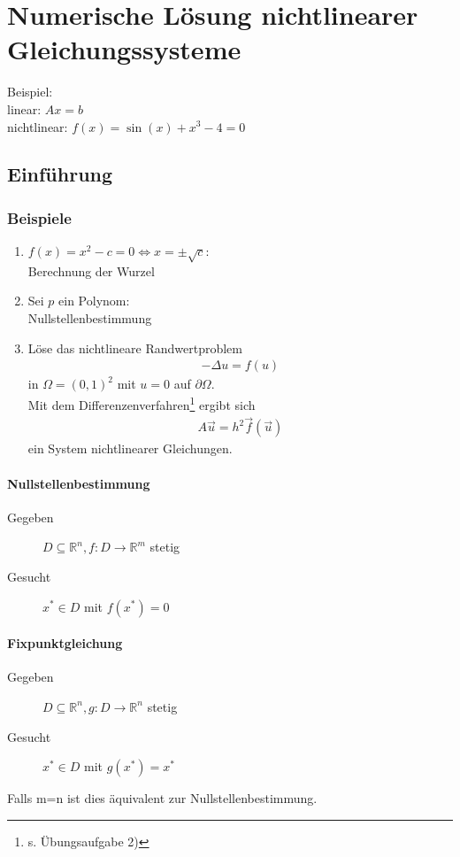 \documentclass[ngerman,fontsize=11pt, paper=a4, parskip=half, titlepage=true, toc=bib]{scrbook}
\newcommand{\R}{\mathds{R}}
\newcommand{\sectione}[1]{\section{#1} \setcounter{equation}{0}}
\begin{document}
	  \chapter{Numerische Lösung nichtlinearer Gleichungssysteme}
	  Beispiel:\\
	  linear: $Ax=b$ \\
	  nichtlinear: $f(x) = \sin(x) +x^3-4=0$
	  
	  \sectione{Einführung}
	  \subsection{Beispiele}
	  \begin{enumerate}[1)]
	  	\item $f(x) = x^2-c = 0 \Leftrightarrow x= \pm \sqrt{c}$: \\Berechnung der Wurzel
	  	\item Sei $p$ ein Polynom:\\ Nullstellenbestimmung
	  	\item Löse das nichtlineare Randwertproblem
	  			\begin{gather*}
	  				-\Delta u = f(u)
	  			\end{gather*}
	  			in $\Omega=(0,1)^2$ mit $u=0$ auf $\partial \Omega$. \\
	  			Mit dem Differenzenverfahren\footnote{s. Übungsaufgabe 2)}
	  			ergibt sich
	  			\begin{gather*}
	  				A\vec{u} = h^2 \vec{f}(\vec{u})
	  			\end{gather*}
	  			ein System nichtlinearer Gleichungen.
	  \end{enumerate}
	  
	  \subsubsection{Nullstellenbestimmung}
	  \begin{description}
	  	\item[Gegeben]   $D\subseteq \R^n, f: D\rightarrow \R^m$ stetig
	  	\item[Gesucht]    $x^{*}\in D $ mit $f(x^{*}) = 0$
	  \end{description}
	
	\subsubsection{Fixpunktgleichung}
	  	  \begin{description}
	  	  	\item[Gegeben]   $D\subseteq \R^n, g: D\rightarrow \R^n$ stetig
	  	  	\item[Gesucht]      $x^{*}\in D $ mit $g(x^{*}) = x^{*}$
	  	  \end{description}
	  	  Falls m=n ist dies äquivalent zur Nullstellenbestimmung.
	  	  
\end{document}
